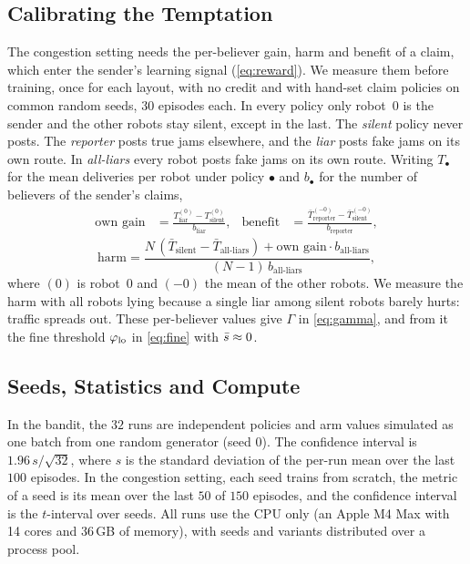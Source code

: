 \subsection{Calibrating the Temptation}

The congestion setting needs the per-believer gain, harm and benefit of a claim, which enter the sender's learning signal (\cref{eq:reward}). We measure them before training, once for each layout, with no credit and with hand-set claim policies on common random seeds, $30$ episodes each. In every policy only robot~$0$ is the sender and the other robots stay silent, except in the last. The \emph{silent} policy never posts. The \emph{reporter} posts true jams elsewhere, and the \emph{liar} posts fake jams on its own route. In \emph{all-liars} every robot posts fake jams on its own route. Writing $T_\bullet$ for the mean deliveries per robot under policy $\bullet$ and $b_\bullet$ for the number of believers of the sender's claims,
\begin{align*}
  \text{own gain} &= \frac{T_{\text{liar}}^{(0)}-T_{\text{silent}}^{(0)}}{b_{\text{liar}}}, &
  \text{benefit} &= \frac{\bar T_{\text{reporter}}^{(-0)}-\bar T_{\text{silent}}^{(-0)}}{b_{\text{reporter}}},
\end{align*}
\[
  \text{harm}=\frac{N\,(\bar T_{\text{silent}}-\bar T_{\text{all-liars}})+\text{own gain}\cdot b_{\text{all-liars}}}{(N-1)\,b_{\text{all-liars}}},
\]
where $(0)$ is robot~$0$ and $(-0)$ the mean of the other robots. We measure the harm with all robots lying because a single liar among silent robots barely hurts: traffic spreads out. These per-believer values give $\Gamma$ in \cref{eq:gamma}, and from it the fine threshold $\varphi_{\mathrm{lo}}$ in \cref{eq:fine} with $\bar s\approx0$.

\subsection{Seeds, Statistics and Compute}

In the bandit, the $32$ runs are independent policies and arm values simulated as one batch from one random generator (seed $0$). The confidence interval is $1.96\,s/\sqrt{32}$, where $s$ is the standard deviation of the per-run mean over the last $100$ episodes. In the congestion setting, each seed trains from scratch, the metric of a seed is its mean over the last $50$ of $150$ episodes, and the confidence interval is the $t$-interval over seeds. All runs use the CPU only (an Apple M4 Max with 14 cores and 36\,GB of memory), with seeds and variants distributed over a process pool.


